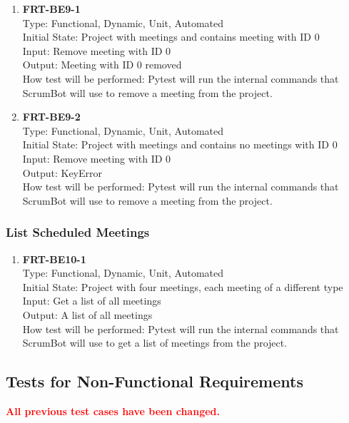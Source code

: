 \documentclass[12pt, titlepage]{article}
\begin{document}
\begin{enumerate}
    \item{\textbf{FRT-BE9-1}}\\
    Type: Functional, Dynamic, Unit, Automated\\
    Initial State: Project with meetings and contains meeting with ID 0\\
    Input: Remove meeting with ID 0\\
    Output: Meeting with ID 0 removed\\
    How test will be performed: Pytest will run the internal commands that ScrumBot will use to remove a meeting from the project.
    
    \item{\textbf{FRT-BE9-2}}\\
    Type: Functional, Dynamic, Unit, Automated\\
    Initial State: Project with meetings and contains no meetings with ID 0\\
    Input: Remove meeting with ID 0\\
    Output: KeyError\\
    How test will be performed: Pytest will run the internal commands that ScrumBot will use to remove a meeting from the project.
\end{enumerate}

\subsubsection{List Scheduled Meetings}
\begin{enumerate}
    \item{\textbf{FRT-BE10-1}}\\
    Type: Functional, Dynamic, Unit, Automated\\
    Initial State: Project with four meetings, each meeting of a different type\\
    Input: Get a list of all meetings\\
    Output: A list of all meetings\\
    How test will be performed: Pytest will run the internal commands that ScrumBot will use to get a list of meetings from the project.
\end{enumerate}

\subsection{Tests for Non-Functional Requirements}
\textcolor{red}{\textbf{All previous test cases have been changed.}}
\end{document}
